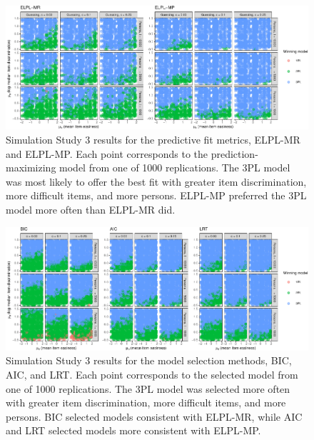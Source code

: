 \documentclass[
  english,
  man,floatsintext]{apa7}
\begin{document}
\begin{figure}

{\centering \includegraphics[width=2100px]{irt-predictive-fit-apa_files/figure-latex/results5b1-1}

}

\caption{Simulation Study 3 results for the predictive fit metrics, ELPL-MR and ELPL-MP. Each point corresponds to the prediction-maximizing model from one of 1000 replications. The 3PL model was most likely to offer the best fit with greater item discrimination, more difficult items, and more persons. ELPL-MP preferred the 3PL model more often than ELPL-MR did.}\label{fig:results5b1}
\end{figure}

\begin{figure}

{\centering \includegraphics[width=2100px]{irt-predictive-fit-apa_files/figure-latex/results5b2-1}

}

\caption{Simulation Study 3 results for the model selection methods, BIC, AIC, and LRT. Each point corresponds to the selected model from one of 1000 replications. The 3PL model was selected more often with greater item discrimination, more difficult items, and more persons. BIC selected models consistent with ELPL-MR, while AIC and LRT selected models more consistent with ELPL-MP.}\label{fig:results5b2}
\end{figure}
\end{document}
